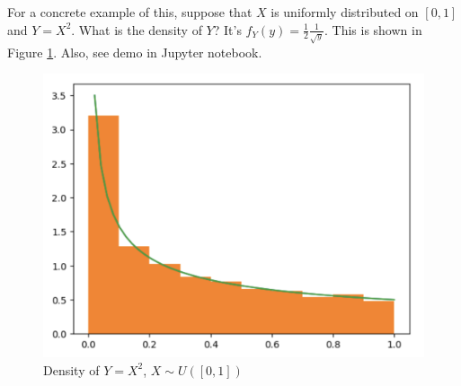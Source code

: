 \documentclass{book}
\begin{document}
For a concrete example of this, suppose that $X$ is uniformly distributed on $[0,1]$ and $Y = X^2$. What is the density of $Y$? It's $f_Y(y) = \frac{1}{2}\frac{1}{\sqrt{y}}$. This is shown in Figure \ref{fig:cov-example1}. Also, see demo in Jupyter notebook.
\begin{figure}[h] \label{fig:cov-example1}
\centering
\centering
\includegraphics[scale = .5]{change_of_variables/cov-example1.png}
\caption{Density of $Y = X^2$, $X\sim U([0,1])$}
\end{figure}
\end{document}
